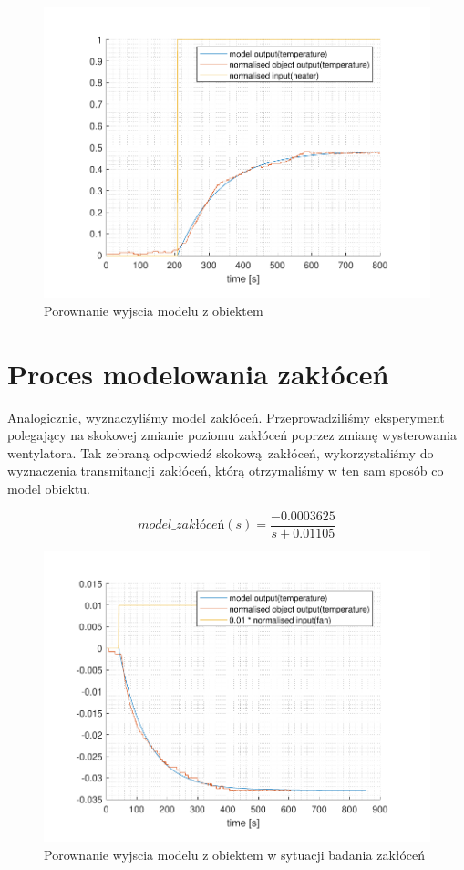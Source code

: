 \documentclass{mwrep}
\begin{document}
\begin{figure}[H]
\centering
\includegraphics[scale=0.8]{materialy/krystian_plots/wykresik_model_obiekt.pdf}
\caption{Porownanie wyjscia modelu z obiektem}
\end{figure}

\section{Proces modelowania zakłóceń}
\label{ModelowanieZaklocen}
Analogicznie, wyznaczyliśmy model zakłóceń. Przeprowadziliśmy eksperyment polegający na skokowej zmianie 
poziomu zakłóceń poprzez zmianę wysterowania wentylatora. Tak zebraną odpowiedź skokową zakłóceń, wykorzystaliśmy
do wyznaczenia transmitancji zakłóceń, którą otrzymaliśmy w ten sam sposób co model obiektu.

\[model\_zakłóceń(s) = \frac{-0.0003625}{s + 0.01105}\]

\begin{figure}[H]
\centering
\includegraphics[scale=0.8]{materialy/krystian_plots/wykresik_zaklocenia.pdf}
\caption{Porownanie wyjscia modelu z obiektem w sytuacji badania zakłóceń}
\end{figure}
\end{document}

